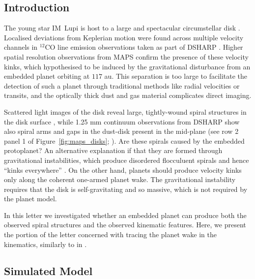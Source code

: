 \subsection{Introduction}

The young star IM~Lupi is host to a large and spectacular circumstellar disk \citep{panic2009,avenhaus2018,cleeves2016,pinte2018}.
Localised deviations from Keplerian motion were found across multiple velocity channels in $^12$CO line emission observations \citep{pinte2020} taken as part of DSHARP \cite{huang2018,andrews2018}.
Higher spatial resolution observations from MAPS confirm the presence of these velocity kinks, which \citet{pinte2020} hypothesised to be induced by the gravitational disturbance from an embedded planet orbiting at $117$ au.
This separation is too large to facilitate the detection of such a planet through traditional methods like radial velocities or transits, and the optically thick dust and gas material complicates direct imaging.

Scattered light images of the disk reveal large, tightly-wound spiral structures in the disk surface \citep[see Figure~\ref{fig:im_lup};][]{avenhaus2018},
while 1.25 mm continuum observations from DSHARP show also spiral arms and gaps in the dust-disk present in the mid-plane (see row 2 panel 1 of Figure~\ref{fig:maps_disks}; \citealt{huang2018}).
Are these spirals caused by the embedded protoplanet?
An alternative explanation if that they are formed through gravitational instabilities, which produce disordered flocculuent spirals and hence ``kinks everywhere'' \citep{hall2020}.
On the other hand, planets should produce velocity kinks only along the coherent one-armed planet wake.
The gravitational instability requires that the disk is self-gravitating and so massive, which is not required by the planet model.

In this letter we investigated whether an embedded planet can produce both the observed spiral structures and the observed kinematic features.
Here, we present the portion of the letter concerned with tracing the planet wake in the kinematics, similarly to in \citet{calcino2022}.

\subsection{Simulated Model}


